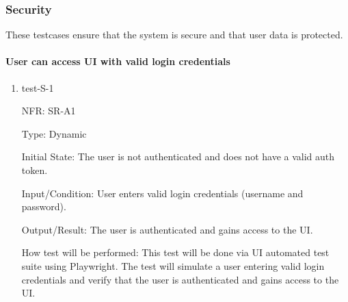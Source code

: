 \documentclass[12pt, titlepage]{article}
\begin{document}
\subsubsection{Security}
These testcases ensure that the system is secure and that user data is protected.

\paragraph{User can access UI with valid login credentials}
\begin{enumerate}
  \item{test-S-1}

  NFR: SR-A1

  Type: Dynamic
            
  Initial State: The user is not authenticated and does not have a valid auth token.
            
  Input/Condition: User enters valid login credentials (username and password).
            
  Output/Result: The user is authenticated and gains access to the UI.
            
  How test will be performed: 
  This test will be done via UI automated test suite using Playwright. The test 
  will simulate a user entering valid login credentials and verify that the user 
  is authenticated and gains access to the UI.
\end{enumerate}
\end{document}
